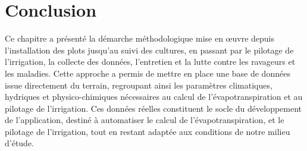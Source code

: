 \section{Conclusion} 
Ce chapitre a présenté la démarche méthodologique mise en œuvre depuis l’installation des plots jusqu’au suivi des cultures, en passant par le pilotage de l’irrigation, la collecte des données, l’entretien et la lutte contre les ravageurs et les maladies. Cette approche a permis de mettre en place une base de données issue directement du terrain, regroupant ainsi les paramètres climatiques, hydriques et physico-chimiques nécessaires au calcul de l'évapotranspiration et au pilotage de l’irrigation. Ces données réelles constituent le socle du développement de l’application, destiné à automatiser le  calcul de l'évapotranspiration, et le pilotage de l’irrigation, tout en restant adaptée aux conditions de notre milieu d'étude.
